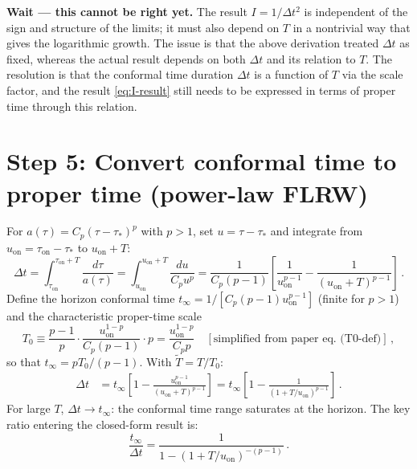 \documentclass[12pt]{article}
\newcommand{\Scfac}{a}
\newcommand{\lb}{\left}
\newcommand{\rb}{\right}
\begin{document}
\medskip
\noindent
\textbf{Wait — this cannot be right yet.}  The result $I = 1/\Delta t^{2}$ is independent
of the sign and structure of the limits; it must also depend on $T$ in a nontrivial way
that gives the logarithmic growth.  The issue is that the above derivation treated $\Delta t$
as fixed, whereas the actual result depends on both $\Delta t$ and its relation to $T$.
The resolution is that the conformal time duration $\Delta t$ is a function of $T$ via the
scale factor, and the result \eqref{eq:I-result} still needs to be expressed in terms of proper time
through this relation.

\section*{Step 5: Convert conformal time to proper time (power-law FLRW)}

For $\Scfac(\tau) = C_{p}(\tau-\tau_{*})^{p}$ with $p > 1$, set $u = \tau - \tau_{*}$ and
integrate from $u_{\mathrm{on}} = \tau_{\mathrm{on}}-\tau_{*}$ to $u_{\mathrm{on}}+T$:
%
\begin{equation}
  \Delta t
  =
  \int_{\tau_{\mathrm{on}}}^{\tau_{\mathrm{on}}+T}\frac{d\tau}{\Scfac(\tau)}
  =
  \int_{u_{\mathrm{on}}}^{u_{\mathrm{on}}+T}\frac{du}{C_{p}u^{p}}
  =
  \frac{1}{C_{p}(p-1)}\lb[\frac{1}{u_{\mathrm{on}}^{p-1}} - \frac{1}{(u_{\mathrm{on}}+T)^{p-1}}\rb] \,.
  \label{eq:Deltat-exact}
\end{equation}
%
Define the horizon conformal time $t_{\infty} = 1/[C_{p}(p-1)u_{\mathrm{on}}^{p-1}]$
(finite for $p>1$) and the characteristic proper-time scale
%
\begin{equation}
  T_{0}
  \equiv
  \frac{p-1}{p}\cdot\frac{u_{\mathrm{on}}^{1-p}}{C_{p}(p-1)}
  \cdot p
  = \frac{u_{\mathrm{on}}^{1-p}}{C_{p}p}
  \quad [\text{simplified from paper eq.\ (T0-def)}] \,,
\end{equation}
%
so that $t_{\infty} = p T_{0}/(p-1)$.  With $\widetilde{T} = T/T_{0}$:
%
\begin{align}
  \Delta t
  &=
  t_{\infty}\lb[1 - \frac{u_{\mathrm{on}}^{p-1}}{(u_{\mathrm{on}}+T)^{p-1}}\rb]
  =
  t_{\infty}\lb[1 - \frac{1}{(1+T/u_{\mathrm{on}})^{p-1}}\rb] \,.
\end{align}
%
For large $T$, $\Delta t \to t_{\infty}$: the conformal time range saturates at the
horizon.  The key ratio entering the closed-form result is:
%
\begin{equation}
  \frac{t_{\infty}}{\Delta t}
  =
  \frac{1}{1-(1+T/u_{\mathrm{on}})^{-(p-1)}} \,.
\end{equation}
\end{document}
